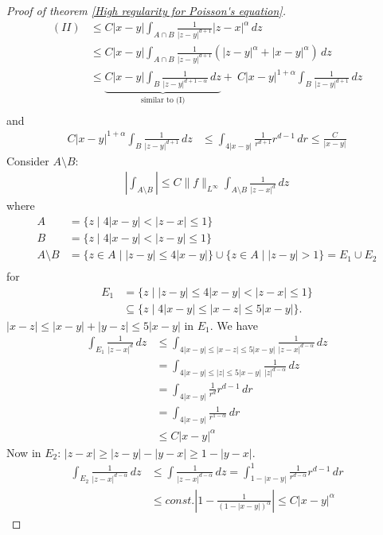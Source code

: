 \documentclass{report}
\theoremstyle{tommy}
\begin{document}
\begin{proof}[Proof of theorem \ref{High regularity for Poisson's equation}]
    \begin{align*}
      (II) &\le C |x-y| \int_{A \cap B} \frac{1}{|z-y|^{d+1}} |z-x|^\alpha \, dz \\
      &\le C |x-y| \int_{A \cap B} \frac{1}{|z-y|^{d+1}} \left(|z-y|^\alpha + |x-y|^\alpha\right) \, dz \\
      &\le \underbrace{C |x-y| \int_B \frac{1}{|z-y|^{d+1-\alpha}} \, dz}_{\text{similar to (I)}} +\ C |x-y|^{1+\alpha} \int_B \frac{1}{|z-y|^{d+1}} \, dz \\
    \end{align*}
    and \begin{align*}
      C |x-y|^{1+\alpha} \int_B \frac{1}{|z-y|^{d+1}} \, dz
      &\le \int_{4|x-y|} \frac{1}{r^{d+1}} r^{d-1} \, dr 
      \le \frac{C}{|x-y|}
    \end{align*}
    Consider \(A \setminus B\): 
    \begin{align*}
      \left| \int_{A \setminus B} \right| \le C \|f\|_{L^\infty} \int_{A \setminus B} \frac{1}{|z-x|^d} \, dz
    \end{align*}
    where
    \begin{align*}
      A &= \{z \mid 4 |x-y| < |z-x| \le 1\} \\
      B &= \{z \mid 4 |x-y| < |z-y| \le 1\} \\
      A \setminus B &= \{z \in A \mid |z-y| \le 4 |x-y|\} \cup \{z \in A \mid |z-y| > 1\} = E_1 \cup E_2 \\
    \end{align*}
    for 
    \begin{align*}
      E_1 &= \{z \mid |z-y| \le 4 |x-y| < |z-x| \le 1\} \\
      &\subseteq \{ z \mid 4 |x-y| \le |x-z| \le 5 |x-y| \}.
    \end{align*}
    \(|x-z| \le |x-y| + |y-z| \le 5 |x-y|\) in \(E_1\).
    We have 
    \begin{align*}
      \int_{E_1} \frac{1}{|z-x|^d} \, dz 
      &\le \int_{4|x-y| \le |x-z| \le 5 |x-y|} \frac{1}{|z-x|^{d-\alpha}} \, dz \\
      &= \int_{4|x-y| \le |z| \le 5 |x-y|} \frac{1}{|z|^{d-\alpha}} \, dz \\
      &= \int_{4|x-y|} \frac{1}{r^d} r^{d-1} \, dr \\
      &= \int_{4|x-y|} \frac{1}{r^{1-\alpha}} \, dr \\
      &\le C |x-y|^\alpha
    \end{align*}
    Now in \(E_2\): \(|z-x| \ge |z-y| - |y-x| \ge 1 - |y-x|\).
    \begin{align*}
      \int_{E_2} \frac{1}{|z-x|^{d-\alpha}} \, dz
      &\le \int \frac{1}{|z-x|^{d-\alpha}} \, dz
      = \int_{1-|x-y|}^1 \frac{1}{r^{d-\alpha}} r^{d-1} \, dr \\
      &\le const. \left| 1 - \frac{1}{(1 - |x-y|)^\alpha} \right| \le C |x-y|^\alpha
    \end{align*}
  \end{proof}
\end{document}
